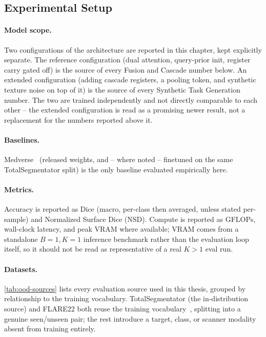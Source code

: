 \subsection{Experimental Setup}\label{sec:results-setup}

\paragraph{Model scope.} Two configurations of the architecture are
reported in this chapter, kept explicitly separate. The reference
configuration (dual attention, query-prior init, register carry gated
off) is the source of every Fusion and Cascade number below. An extended
configuration (adding cascade registers, a pooling token, and synthetic
texture noise on top of it) is the source of every Synthetic Task
Generation number. The two are trained independently and not directly
comparable to each other -- the extended configuration is read as a
promising newer result, not a replacement for the numbers reported above
it. 

\paragraph{Baselines.} Medverse~\cite{huMedverseUniversalModel2025a}
(released weights, and -- where noted -- finetuned on the same
TotalSegmentator split) is the only baseline evaluated empirically here.

\paragraph{Metrics.} Accuracy is reported as Dice (macro, per-class then
averaged, unless stated per-sample) and Normalized Surface Dice (NSD).
Compute is reported as GFLOPs, wall-clock latency, and peak VRAM where
available; VRAM comes from a standalone $B{=}1,K{=}1$ inference benchmark
rather than the evaluation loop itself, so it should not be read as
representative of a real $K{>}1$ eval run.

\paragraph{Datasets.} \autoref{tab:ood-sources} lists every evaluation source used in this
thesis, grouped by relationship to the training vocabulary. TotalSegmentator (the
in-distribution source) and FLARE22 both reuse the training
vocabulary~\cite{wasserthalTotalSegmentatorRobustSegmentation2023}, splitting into a genuine
seen/unseen pair; the rest introduce a target, class, or scanner modality absent from
training entirely.

